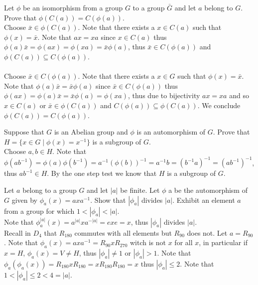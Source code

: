 \documentclass[12pt]{article}
\makeatletter
\theoremstyle{homework}
\newenvironment{exercise}[1]
{\def\@currentlabel{#1}\exercisecore}
{\endexercisecore}
\makeatother
\begin{document}
\begin{exercise}{6.48}
Let $\phi$ be an isomorphism from a group $G$ to a group $\bar{G}$ and let $a$ belong to $G$. Prove that $\phi(C(a)) = C(\phi(a))$.\\
Choose $\bar{x}\in \phi(C(a))$.  Note that there exists a $x\in C(a)$ such that $\phi(x)=\bar{x}$.  Note that $ax=xa$ since $x\in C(a)$ thus $\phi(a)\bar{x}=\phi(ax)=\phi(xa)=\bar{x}\phi(a)$, thus $\bar{x}\in C(\phi(a))$ and $\phi(C(a)) \subseteq C(\phi(a))$.\\\\
Choose $\bar{x}\in C(\phi(a))$.  Note that there exists a $x\in G$ such that $\phi(x)=\bar{x}$.  Note that $\phi(a)\bar{x}=\bar{x}\phi(a)$ since $\bar{x}\in C(\phi(a))$ thus $\phi(ax)=\phi(a)\bar{x}=\bar{x}\phi(a)=\phi(xa)$, thus due to bijectivity $ax=xa$ and so $x\in C(a)$ or $\bar{x}\in \phi(C(a))$ and $C(\phi(a)) \subseteq \phi(C(a))$.  We conclude $\phi(C(a)) = C(\phi(a))$.
\end{exercise}

\begin{exercise}{6.51}
Suppose that $G$ is an Abelian group and $\phi$ is an automorphism of $G$. Prove that $H = \{x \in G \mid \phi(x) = x^{-1} \}$ is a subgroup of $G$.\\
Choose $a,b\in H$.  Note that $\phi(ab^{-1})=\phi(a)\phi(b^{-1})=a^{-1}(\phi(b))^{-1}=a^{-1}b=(b^{-1}a)^{-1}=(ab^{-1})^{-1}$, thus $ab^{-1}\in H$.  By the one step test we know that $H$ is a subgroup of $G$.
\end{exercise}

\begin{exercise}{6.53}
Let $a$ belong to a group $G$ and let $|a|$ be finite.  Let $\phi$ a be the automorphism of $G$ given by $\phi_a(x) = axa^{-1}$.  Show that $|\phi_a |$ divides $|a|$.  Exhibit an element $a$ from a group for which $1 < |\phi_a | < |a|$.\\
Note that $\phi_a^{|a|}(x)=a^{|a|}xa^{-|a|}=exe=x$, thus $|\phi_a |$ divides $|a|$.\\
Recall in $D_4$ that $R_{180}$ commutes with all elements but $R_{90}$ does not.  Let $a=R_{90}$.  Note that $\phi_a(x) = axa^{-1}=R_{90}xR_{270}$ witch is not $x$ for all $x$, in particular if $x=H$, $\phi_a(x)=V\neq H$, thus $|\phi_a|\neq 1$ or $|\phi_a|> 1$.  Note that $\phi_a(\phi_a(x))=R_{180}xR_{180}=xR_{180}R_{180}=x$ thus $|\phi_a|\leq 2$.  Note that $1<|\phi_a|\leq 2<4=|a|$.
\end{exercise}
\end{document}
